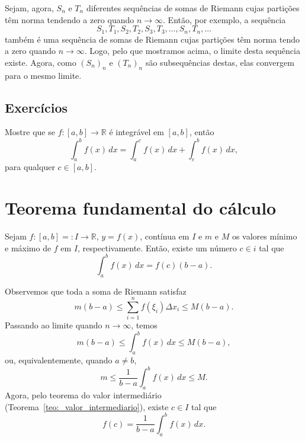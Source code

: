 \begin{dem}
Sejam, agora, $S_n$ e $T_n$ diferentes sequências de somas de Riemann cujas partições têm norma tendendo a zero quando $n\to\infty$. Então, por exemplo, a sequência
\begin{equation}
  S_1, T_1, S_2, T_2, S_3, T_3, \dotsc, S_n, T_n, \ldots
\end{equation}
também é uma sequência de somas de Riemann cujas partições têm norma tendo a zero quando $n\to\infty$. Logo, pelo que mostramos acima, o limite desta sequência existe. Agora, como $(S_n)_n$ e $(T_n)_n$ são subsequências destas, elas convergem para o mesmo limite.
\end{dem}

\subsection*{Exercícios}

\begin{exer}
  Mostre que se $f:[a, b]\to\mathbb{R}$ é integrável em $[a, b]$, então
  \begin{equation}
    \int_a^b f(x)\,dx = \int_a^c f(x)\,dx + \int_c^b f(x)\,dx,
  \end{equation}
para qualquer $c\in [a, b]$.
\end{exer}

\section{Teorema fundamental do cálculo}

\begin{teo}\label{teo:da_media}
  Sejam $f:[a,b]=:I\to\mathbb{R}$, $y=f(x)$, contínua em $I$ e $m$ e $M$ os valores mínimo e máximo de $f$ em $I$, respectivamente. Então, existe um número $c\in i$ tal que
  \begin{equation}
    \int_a^b f(x)\,dx = f(c)(b-a).
  \end{equation}
\end{teo}
\begin{dem}
  Observemos que toda a soma de Riemann satisfaz
  \begin{equation}
    m(b-a) \leq \sum_{i=1}^n f(\xi_i)\Delta x_i \leq M(b-a).
  \end{equation}
Passando ao limite quando $n\to \infty$, temos
\begin{equation}
    m(b-a) \leq \int_a^b f(x)\,dx \leq M(b-a),
\end{equation}
ou, equivalentemente, quando $a\neq b$,
\begin{equation}
    m \leq \frac{1}{b-a}\int_a^b f(x)\,dx \leq M.
\end{equation}
Agora, pelo teorema do valor intermediário (Teorema~\ref{teo:_valor_intermediario}), existe $c\in I$ tal que
\begin{equation}
  f(c) = \frac{1}{b-a}\int_a^b f(x)\,dx.
\end{equation}
\end{dem}

